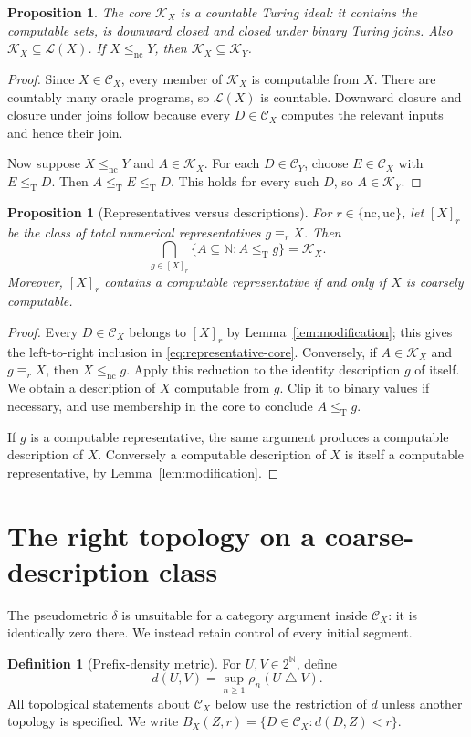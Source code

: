\documentclass[11pt,a4paper]{article}
\newcommand{\N}{\mathbb N}
\newcommand{\Cantor}{2^{\N}}
\newcommand{\leT}{\leq_{\mathrm T}}
\newcommand{\nc}{\mathrm{nc}}
\newcommand{\uc}{\mathrm{uc}}
\newcommand{\CD}[1]{\mathcal C_{#1}}
\newcommand{\Core}[1]{\mathcal K_{#1}}
\newcommand{\Low}[1]{\mathcal L(#1)}
\newcommand{\sdelta}{\mathbin{\triangle}}
\newtheorem{proposition}[theorem]{Proposition}
\theoremstyle{definition}\newtheorem{definition}[theorem]{Definition}
\theoremstyle{remark}\newtheorem{remark}[theorem]{Remark}
\begin{document}
\begin{proposition}\label{prop:core}
The core $\Core X$ is a countable Turing ideal: it contains the computable sets, is downward closed and closed under binary Turing joins. Also $\Core X\subseteq\Low X$. If $X\le_{\nc}Y$, then $\Core X\subseteq\Core Y$.
\end{proposition}
\begin{proof}
Since $X\in\CD X$, every member of $\Core X$ is computable from $X$. There are countably many oracle programs, so $\Low X$ is countable. Downward closure and closure under joins follow because every $D\in\CD X$ computes the relevant inputs and hence their join.

Now suppose $X\le_{\nc}Y$ and $A\in\Core X$. For each $D\in\CD Y$, choose $E\in\CD X$ with $E\leT D$. Then $A\leT E\leT D$. This holds for every such $D$, so $A\in\Core Y$.
\end{proof}

\begin{proposition}[Representatives versus descriptions]\label{prop:representatives}
For $r\in\{\nc,\uc\}$, let $[X]_r$ be the class of total numerical representatives $g\equiv_r X$. Then
\begin{equation}\label{eq:representative-core}
 \bigcap_{g\in[X]_r}\{A\subseteq\N:A\leT g\}=\Core X.
\end{equation}
Moreover, $[X]_r$ contains a computable representative if and only if $X$ is coarsely computable.
\end{proposition}
\begin{proof}
Every $D\in\CD X$ belongs to $[X]_r$ by Lemma~\ref{lem:modification}; this gives the left-to-right inclusion in \eqref{eq:representative-core}. Conversely, if $A\in\Core X$ and $g\equiv_r X$, then $X\le_{\nc}g$. Apply this reduction to the identity description $g$ of itself. We obtain a description of $X$ computable from $g$. Clip it to binary values if necessary, and use membership in the core to conclude $A\leT g$.

If $g$ is a computable representative, the same argument produces a computable description of $X$. Conversely a computable description of $X$ is itself a computable representative, by Lemma~\ref{lem:modification}.
\end{proof}

\section{The right topology on a coarse-description class}
\label{sec:topology}
The pseudometric $\delta$ is unsuitable for a category argument inside $\CD X$: it is identically zero there. We instead retain control of every initial segment.
\begin{definition}[Prefix-density metric]
For $U,V\in\Cantor$, define
\begin{equation}\label{eq:metric}
             d(U,V)=\sup_{n\ge1}\rho_n(U\sdelta V).
\end{equation}
All topological statements about $\CD X$ below use the restriction of $d$ unless another topology is specified. We write $B_X(Z,r)=\{D\in\CD X:d(D,Z)<r\}$.
\end{definition}
\end{document}
